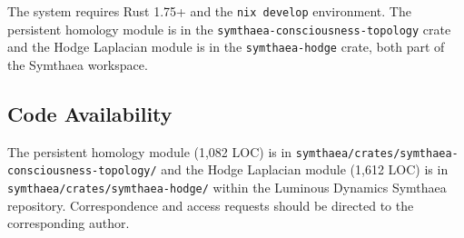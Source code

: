\documentclass[11pt,a4paper]{article}
\begin{document}
The system requires Rust 1.75+ and the \texttt{nix develop} environment. The persistent homology module is in the \texttt{symthaea-consciousness-topology} crate and the Hodge Laplacian module is in the \texttt{symthaea-hodge} crate, both part of the Symthaea workspace.

\subsection*{Code Availability}

The persistent homology module (1,082 LOC) is in \texttt{symthaea/crates/symthaea-consciousness-topology/} and the Hodge Laplacian module (1,612 LOC) is in \texttt{symthaea/crates/symthaea-hodge/} within the Luminous Dynamics Symthaea repository. Correspondence and access requests should be directed to the corresponding author.



\end{document}
